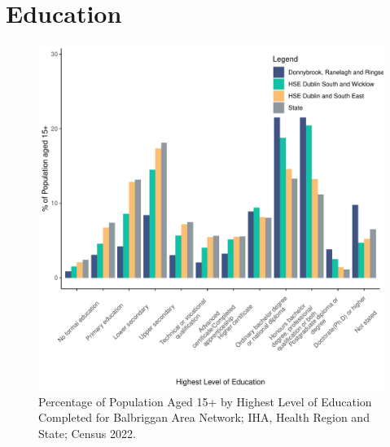 \documentclass{article}
\begin{document}
\section{Education}\label{sect:Edu}
\begin{figure}[H]
	\centering
	\includegraphics[width = 120mm]{../figures/EduED.pdf}
	\caption{Percentage of Population Aged 15+ by Highest Level of Education Completed for Balbriggan Area Network; IHA, Health Region and State; Census 2022.}
	\label{fig:vbnv}
	\end{figure}
\end{document}
